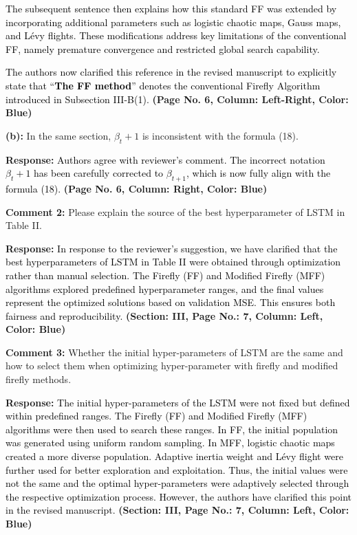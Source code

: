 \documentclass[12pt]{article}
\begin{document}
{\textcolor{black}{The subsequent sentence then explains how this standard FF was extended by incorporating additional parameters such as logistic chaotic maps, Gauss maps, and Lévy flights. These modifications address key limitations of the conventional FF, namely premature convergence and restricted global search capability.}

\textcolor{black}{The authors now clarified this reference in the revised manuscript to explicitly state that “\textbf{The FF method}” denotes the conventional Firefly Algorithm introduced in Subsection III-B(1).} \textbf{(Page No. 6, Column: Left-Right, Color: Blue)}\newline

\noindent\textbf{(b):} In the same section, $\beta_t+1$ is inconsistent with the formula (18).
\vspace{0.15cm}

\hspace{-1.5em}\textbf{Response:} \noindent\textcolor{black}{Authors agree with reviewer's comment. The incorrect notation $\beta_t+1$ has been carefully corrected to $\beta_{t+1}$, which is now fully align with the formula (18).} \textbf{(Page No. 6, Column: Right, Color: Blue)}\newline
\newline


\noindent\textbf{Comment 2:} Please explain the source of the best hyperparameter of LSTM in Table II.


\hspace{-1.5em}\textbf{Response:} 
\noindent\textcolor{black}{In response to the reviewer’s suggestion, we have clarified that the best hyperparameters of LSTM in Table II were obtained through optimization rather than manual selection. The Firefly (FF) and Modified Firefly (MFF) algorithms explored predefined hyperparameter ranges, and the final values represent the optimized solutions based on validation MSE. This ensures both fairness and reproducibility.} \textbf{(Section: III, Page No.: 7, Column: Left, Color: Blue)}\newline

\noindent\textbf{Comment 3:} Whether the initial hyper-parameters of LSTM are the same and how to select them when optimizing hyper-parameter with firefly and modified firefly methods.


\hspace{-1.5em}\textbf{Response:} \noindent\textcolor{black}{The initial hyper-parameters of the LSTM were not fixed but defined within predefined ranges. The Firefly (FF) and Modified Firefly (MFF) algorithms were then used to search these ranges. In FF, the initial population was generated using uniform random sampling. In MFF, logistic chaotic maps created a more diverse population. Adaptive inertia weight and Lévy flight were further used for better exploration and exploitation. Thus, the initial values were not the same and the optimal hyper-parameters were adaptively selected through the respective optimization process. However, the authors have clarified this point in the revised manuscript.} \textbf{(Section: III, Page No.: 7, Column: Left, Color: Blue)}\newline\newline


}
\end{document}
